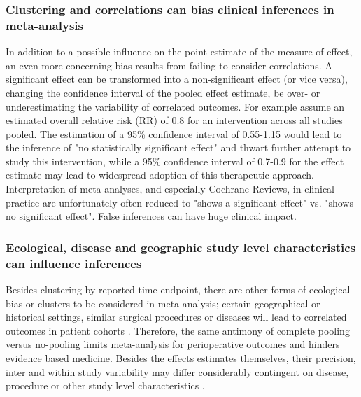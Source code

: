 \documentclass[11pt,notitlepage]{article}
\begin{document}
\subsubsection*{Clustering and correlations can bias clinical inferences in meta-analysis }
In addition to a possible influence on the point estimate of the measure of effect, an even more concerning bias results from failing to consider correlations. A significant effect can be transformed into a non-significant effect (or vice versa), changing the confidence interval of the pooled effect estimate, be over- or underestimating the variability of correlated outcomes. For example assume an estimated overall relative risk (RR) of 0.8 for an intervention across all studies pooled. The estimation of a 95\% confidence interval of 0.55-1.15 would lead to the inference of "no statistically significant effect" and thwart further attempt to study this intervention, while a 95\% confidence interval of 0.7-0.9 for the effect estimate may lead to widespread adoption of this therapeutic approach. Interpretation of meta-analyses, and especially Cochrane Reviews, in clinical practice are unfortunately often reduced to "shows a significant effect" vs. "shows no significant effect". False inferences can have huge clinical impact.

\subsubsection*{Ecological, disease and geographic study level characteristics can influence inferences}
Besides clustering by reported time endpoint, there are other forms of ecological bias or clusters to be considered in meta-analysis; certain geographical or historical settings, similar surgical procedures or diseases will lead to correlated outcomes in patient cohorts \cite{Abroug2011,Andreae2013,Andreae2015,Roth2015CriticalCare}. Therefore, the same antimony of complete pooling versus no-pooling limits meta-analysis for perioperative outcomes and hinders evidence based medicine. Besides the effects estimates themselves, their precision, inter and within study variability may differ considerably contingent on disease, procedure or other study level characteristics \cite{Andreae2013,Andreae2015,Roth2015CriticalCare}.
\end{document}
